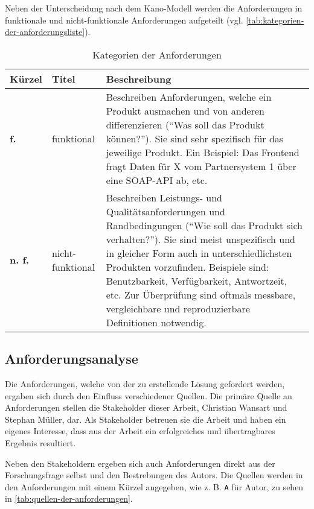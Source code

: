 Neben der Unterscheidung nach dem Kano-Modell werden die Anforderungen in funktionale und nicht-funktionale Anforderungen \cite{FunktionaleUndNichtFunktionaleAnforderungen} aufgeteilt (vgl. \autoref{tab:kategorien-der-anforderungsliste}).

\begin{table}[H]
\begin{tabular}{ |p{1.15cm}|p{2.75cm}|p{9.6cm}| }
	\hline
	Kürzel & Titel & Beschreibung \\
	\hline
	\textbf{f.} & funktional & Beschreiben Anforderungen, welche ein Produkt ausmachen und von anderen differenzieren (\enquote{Was soll das Produkt können?}). Sie sind sehr spezifisch für das jeweilige Produkt. Ein Beispiel: Das Frontend fragt Daten für X vom Partnersystem 1 über eine SOAP-API ab, etc.\\
	\hline
	\textbf{n. f.} & nicht-funktional & Beschreiben Leistungs- und Qualitätsanforderungen und Randbedingungen (\enquote{Wie soll das Produkt sich verhalten?}). Sie sind meist unspezifisch und in gleicher Form auch in unterschiedlichsten Produkten vorzufinden. Beispiele sind: Benutzbarkeit, Verfügbarkeit, Antwortzeit, etc. Zur Überprüfung sind oftmals messbare, vergleichbare und reproduzierbare Definitionen notwendig. \\
	\hline
\end{tabular}
 \captionsetup{justification=centering}
  \caption{Kategorien der Anforderungen \cite{FunktionaleUndNichtFunktionaleAnforderungen}}
   \label{tab:kategorien-der-anforderungsliste}
\end{table}
	
\subsection{Anforderungsanalyse}

Die Anforderungen, welche von der zu erstellende Lösung gefordert werden, ergaben sich durch den Einfluss verschiedener Quellen. Die primäre Quelle an Anforderungen stellen die Stakeholder dieser Arbeit, Christian Wansart und Stephan Müller, dar. Als Stakeholder betreuen sie die Arbeit und haben ein eigenes Interesse, dass aus der Arbeit ein erfolgreiches und übertragbares Ergebnis resultiert.

Neben den Stakeholdern ergeben sich auch Anforderungen direkt aus der Forschungsfrage selbst und den Bestrebungen des Autors. Die Quellen werden in den Anforderungen mit einem Kürzel angegeben, wie z. B. \texttt{A} für Autor, zu sehen in \autoref{tab:quellen-der-anforderungen}.

